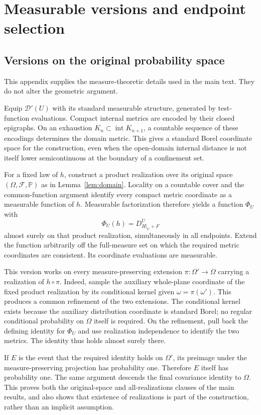 \documentclass[11pt]{article}
\theoremstyle{definition}
\theoremstyle{remark}
\newcommand{\Pp}{\mathbb P}
\newcommand{\Dscr}{\mathcal D'}
\begin{document}
\appendix
\section{Measurable versions and endpoint selection}
\subsection{Versions on the original probability space}\label{app:versions}
This appendix supplies the measure-theoretic details used in
the main text. They do not alter the geometric argument.

Equip $\Dscr(U)$ with its standard measurable structure,
generated by test-function evaluations. Compact internal
metrics are encoded by their closed epigraphs. On an exhaustion
$K_n\subset\operatorname{int}K_{n+1}$, a countable sequence of
these encodings determines the domain metric. This gives a
standard Borel coordinate space for the construction, even
when the open-domain internal distance is not itself lower
semicontinuous at the boundary of a confinement set.

For a fixed law of $h$, construct a product realization over
its original space $(\Omega,\mathcal F,\Pp)$ as in
Lemma~\ref{lem:domain}. Locality on a countable cover and the
common-function argument identify every compact metric
coordinate as a measurable function of $h$. Measurable
factorization therefore yields a function $\Phi_U$ with
\[
                  \Phi_U(h)=D_{H|_U+F}^{U}
\]
almost surely on that product realization, simultaneously in
all endpoints. Extend the function arbitrarily off the
full-measure set on which the required metric coordinates
are consistent. Its coordinate evaluations are measurable.

This version works on every measure-preserving extension
$\pi:\Omega'\to\Omega$ carrying a realization of $h\circ\pi$.
Indeed, sample the auxiliary whole-plane coordinate of the
fixed product realization by its conditional kernel given
$\omega=\pi(\omega')$. This produces a common refinement of
the two extensions. The conditional kernel exists because
the auxiliary distribution coordinate is standard Borel;
no regular conditional probability on $\Omega$ itself is
required. On the refinement, pull back the defining identity
for $\Phi_U$ and use realization independence to identify the
two metrics. The identity thus holds almost surely there.

If $E$ is the event that the required identity holds on
$\Omega'$, its preimage under the measure-preserving
projection has probability one. Therefore $E$ itself has
probability one. The same argument descends the final
covariance identity to $\Omega$. This proves both the
original-space and all-realizations clauses of the main
results, and also shows that existence of realizations is
part of the construction, rather than an implicit assumption.
\end{document}
